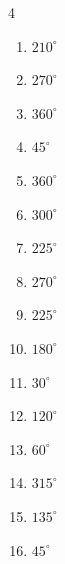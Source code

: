 \begin{multicols}{4}
\begin{enumerate}
\columnbreak %

  \item $\displaystyle 210^{\circ}$

  \item $\displaystyle 270^{\circ}$

  \item $\displaystyle 360^{\circ}$
        \phantom{$\displaystyle =2\pi$}

  \item $\displaystyle 45^{\circ}$

  \item $\displaystyle 360^{\circ}$
        \phantom{$\displaystyle =2\pi$}

  \item $\displaystyle 300^{\circ}$

  \item $\displaystyle 225^{\circ}$

  \item $\displaystyle 270^{\circ}$

  \item $\displaystyle 225^{\circ}$

  \item $\displaystyle 180^{\circ}$
        \phantom{$\displaystyle =\pi$}

  \item $\displaystyle 30^{\circ}$

  \item $\displaystyle 120^{\circ}$

  \item $\displaystyle 60^{\circ}$

  \item $\displaystyle 315^{\circ}$

  \item $\displaystyle 135^{\circ}$

  \item $\displaystyle 45^{\circ}$


\end{enumerate}
\end{multicols}
